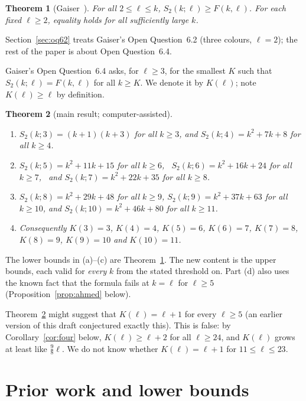 \documentclass[11pt]{amsart}
\newtheorem{theorem}{Theorem}
\theoremstyle{definition}
\newcommand{\F}{F}
\newcommand{\Stwo}{S_2}
\begin{document}
\begin{theorem}[Gaiser~{\cite[Thm.~1.1]{Gaiser}}]\label{thm:gaiser}
For all $2\le\ell\le k$, $\Stwo(k;\ell)\ge\F(k,\ell)$. For each fixed $\ell\ge2$, equality holds for all sufficiently large $k$.
\end{theorem}

\noindent Section~\ref{sec:oq62} treats Gaiser's Open Question~6.2 (three colours, $\ell=2$); the rest of the paper is about Open Question~6.4.

\noindent Gaiser's Open Question~6.4 asks, for $\ell\ge3$, for the smallest $K$ such that $\Stwo(k;\ell)=\F(k,\ell)$ for all $k\ge K$. We denote it by $K(\ell)$; note $K(\ell)\ge\ell$ by definition.

\begin{theorem}[main result; computer-assisted]\label{thm:main}
\begin{enumerate}[label=(\alph*)]
\item $\Stwo(k;3)=(k+1)(k+3)$ for all $k\ge3$, and $\Stwo(k;4)=k^2+7k+8$ for all $k\ge4$.
\item $\Stwo(k;5)=k^2+11k+15$ for all $k\ge6$, \ $\Stwo(k;6)=k^2+16k+24$ for all $k\ge7$, \ and $\Stwo(k;7)=k^2+22k+35$ for all $k\ge8$.
\item $\Stwo(k;8)=k^2+29k+48$ for all $k\ge9$, $\Stwo(k;9)=k^2+37k+63$ for all $k\ge10$, and $\Stwo(k;10)=k^2+46k+80$ for all $k\ge11$.
\item Consequently $K(3)=3$, $K(4)=4$, $K(5)=6$, $K(6)=7$, $K(7)=8$, $K(8)=9$, $K(9)=10$ and $K(10)=11$.
\end{enumerate}
\end{theorem}

The lower bounds in (a)--(c) are Theorem~\ref{thm:gaiser}. The new content is the upper bounds, each valid for \emph{every} $k$ from the stated threshold on. Part (d) also uses the known fact that the formula fails at $k=\ell$ for $\ell\ge5$ (Proposition~\ref{prop:ahmed} below).

\noindent Theorem~\ref{thm:main} might suggest that $K(\ell)=\ell+1$ for every $\ell\ge5$ (an earlier version of this draft conjectured exactly this). This is false: by Corollary~\ref{cor:four} below, $K(\ell)\ge\ell+2$ for all $\ell\ge24$, and $K(\ell)$ grows at least like $\tfrac98\ell$. We do not know whether $K(\ell)=\ell+1$ for $11\le\ell\le23$.

\section{Prior work and lower bounds}\label{sec:prior}
\end{document}
